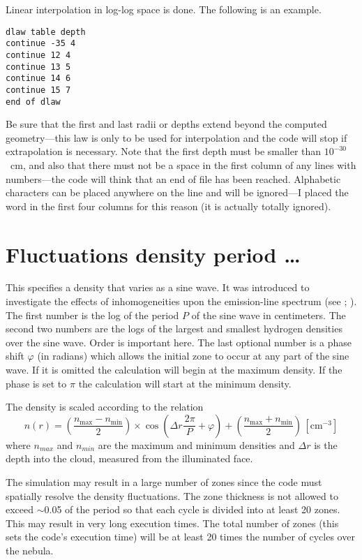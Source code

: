 Linear interpolation in log-log space is done.
The following is an example.
\begin{verbatim}
dlaw table depth
continue -35 4
continue 12 4
continue 13 5
continue 14 6
continue 15 7
end of dlaw
\end{verbatim}

Be sure that the first and last radii or depths extend beyond the computed
geometry---this law is only to be used for interpolation and the code will
stop if extrapolation is necessary.
Note that the first depth must be
smaller than $10^{-30}$~cm,
and also that there must not be a space in the first
column of any lines with numbers---the code will think that an end of file
has been reached.
Alphabetic characters can be placed anywhere on the line
and will be ignored---I placed the word
 in the first four columns
for this reason (it is actually totally ignored).

\section{Fluctuations density period \dots}

This specifies a density that varies as a sine wave.  It was introduced
to investigate the effects of inhomogeneities upon the
emission-line spectrum
(see \citealp{Mihalszki1983}; \citealp{KingdonFerland1995}).
The first number
is the log of the period $P$ of the sine wave in centimeters.
The second
two numbers are the logs of the largest and smallest hydrogen densities
over the sine wave.  Order is important here.
The last optional number
is a phase shift $\varphi$ (in radians) which allows the initial zone to occur at
any part of the sine wave.
If it is omitted the calculation will begin
at the maximum density.
If the phase is set to $\pi$ the calculation will start
at the minimum density.

The density is scaled according to the relation
\begin{equation}
\label{eqn:commandFluctuations}
n\left( r \right) = \left( {\frac{{n_{\max }  - n_{\min } }}{2}} \right)
\times \cos \left( {\Delta r\frac{{\,2\pi }}{P} + \varphi } \right) + \left(
{\frac{{n_{\max }  + n_{\min } }}{2}} \right)\, [\mathrm{cm}^{-3}]%
\end{equation}
where $n_{max}$ and $n_{min}$ are the maximum and minimum densities and
$\Delta r$ is the
depth into the cloud, measured from the illuminated face.

The simulation may result in a large number of zones since the code must
spatially resolve the density fluctuations.
The zone thickness is not
allowed to exceed ${\sim}$0.05 of the period so that each cycle is
divided into at least 20 zones.
This may result in very long execution times.
The total number of zones (this sets the code's execution time)
will be at least 20
times the number of cycles over the nebula.

